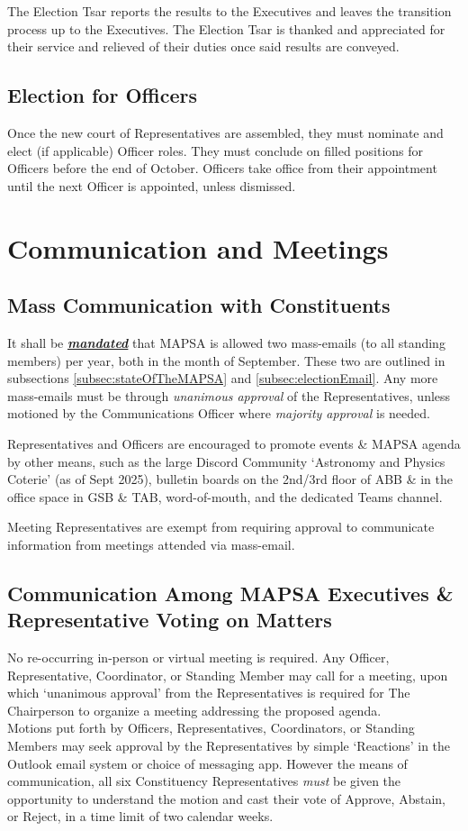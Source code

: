 \documentclass[8pt]{article}
\begin{document}
	The Election Tsar reports the results to the Executives and leaves the transition process up to the Executives. The Election Tsar is thanked and appreciated for their service and relieved of their duties once said results are conveyed.
	
	\subsection{Election for Officers}
	Once the new court of Representatives are assembled, they must nominate and elect (if applicable) Officer roles. They must conclude on filled positions for Officers before the end of October. Officers take office from their appointment until the next Officer is appointed, unless dismissed.
	
	\section{Communication and Meetings}
	\subsection{Mass Communication with Constituents}
	It shall be \textbf{\textit{\underline{mandated}}} that MAPSA is allowed two mass-emails (to all standing members) per year, both in the month of September. These two are outlined in subsections \ref{subsec:stateOfTheMAPSA} and \ref{subsec:electionEmail}. Any more mass-emails must be through \textit{unanimous approval} of the Representatives, unless motioned by the Communications Officer where \textit{majority approval} is needed.

	Representatives and Officers are encouraged to promote events \& MAPSA agenda by other means, such as the large Discord Community `Astronomy and Physics Coterie' (as of Sept 2025), bulletin boards on the 2nd/3rd floor of ABB \& in the office space in GSB \& TAB, word-of-mouth, and the dedicated Teams channel.
	
	Meeting Representatives are exempt from requiring approval to communicate information from meetings attended via mass-email.
	
	\subsection{Communication Among MAPSA Executives \& Representative Voting on Matters}
	No re-occurring in-person or virtual meeting is required. Any Officer, Representative, Coordinator, or Standing Member may call for a meeting, upon which `unanimous approval' from the Representatives is required for The Chairperson to organize a meeting addressing the proposed agenda. \\
	Motions put forth by Officers, Representatives, Coordinators, or Standing Members may seek approval by the Representatives by simple `Reactions' in the Outlook email system or choice of messaging app. However the means of communication, all six Constituency Representatives \textit{must} be given the opportunity to understand the motion and cast their vote of Approve, Abstain, or Reject, in a time limit of two calendar weeks.
	
\end{document}
